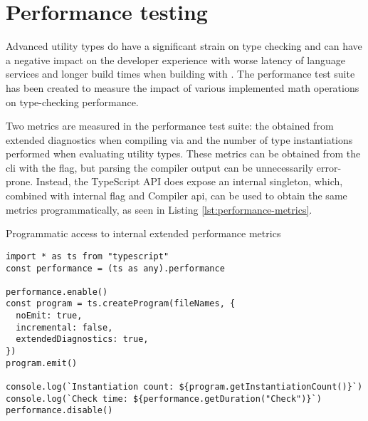 \section{Performance testing}

Advanced utility types do have a significant strain on type checking and can have a negative impact on the developer experience with worse latency of language services and longer build times when building with . The performance test suite has been created to measure the impact of various implemented math operations on type-checking performance.

Two metrics are measured in the performance test suite: the  obtained from extended diagnostics when compiling via  and the number of type instantiations performed when evaluating utility types. These metrics can be obtained from the  \acrshort{cli} with the  flag, but parsing the compiler output can be unnecessarily error-prone. Instead, the TypeScript API does expose an internal  singleton, which, combined with internal  flag and Compiler \acrshort{api}, can be used to obtain the same metrics programmatically, as seen in Listing \ref{lst:performance-metrics}.

\begin{listing}[ht]
  \caption{Programmatic access to internal extended performance metrics}\label{lst:performance-metrics}
  \begin{verbatim}
import * as ts from "typescript"
const performance = (ts as any).performance

performance.enable()
const program = ts.createProgram(fileNames, {
  noEmit: true,
  incremental: false,
  extendedDiagnostics: true,
})
program.emit()

console.log(`Instantiation count: ${program.getInstantiationCount()}`)
console.log(`Check time: ${performance.getDuration("Check")}`)
performance.disable()
\end{verbatim}
\end{listing}


